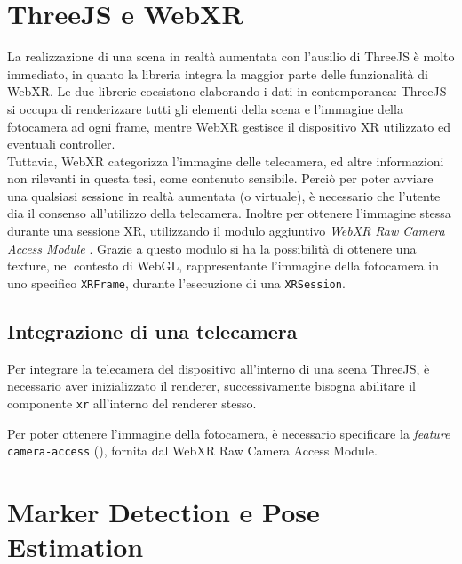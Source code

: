\documentclass[12pt,a4paper,openright,oneside]{book}
\begin{document}
\section{ThreeJS e WebXR}\label{sec:impl_threejs_e_webxr} %
La realizzazione di una scena in realtà aumentata con l'ausilio di ThreeJS è molto immediato, in quanto la libreria integra la maggior parte delle funzionalità di  WebXR.
Le due librerie coesistono elaborando i dati in contemporanea: ThreeJS si occupa di renderizzare tutti gli elementi della scena e l'immagine della fotocamera ad ogni frame, mentre WebXR gestisce il dispositivo XR utilizzato ed eventuali controller.
\\
Tuttavia, WebXR categorizza l'immagine delle telecamera, ed altre informazioni non rilevanti in questa tesi, come contenuto sensibile. Perciò per poter avviare una qualsiasi sessione in realtà aumentata (o virtuale), è necessario che l'utente dia il consenso all'utilizzo della telecamera.
%
Inoltre per ottenere l'immagine stessa durante una sessione XR, utilizzando il modulo aggiuntivo \textit{WebXR Raw Camera Access Module} \cite{webxr_raw_camera}.
Grazie a questo modulo si ha la possibilità di ottenere una texture, nel contesto di WebGL, rappresentante l'immagine della fotocamera in uno specifico \texttt{XRFrame}, durante l'esecuzione di una \texttt{XRSession}.
\subsection{Integrazione di una telecamera}\label{sub:impl_integrazione_di_una_telecamera} %
Per integrare la telecamera del dispositivo all'interno di una scena ThreeJS, è necessario aver inizializzato il renderer, successivamente bisogna abilitare il componente \texttt{xr} all'interno del renderer stesso.
%

Per poter ottenere l'immagine della fotocamera, è necessario specificare la \textit{feature} \texttt{camera-access} (), fornita dal WebXR Raw Camera Access Module.
%


\section{Marker Detection e Pose Estimation}\label{sec:impl_marker_detection_e_pose_estimation} %
%
\end{document}
